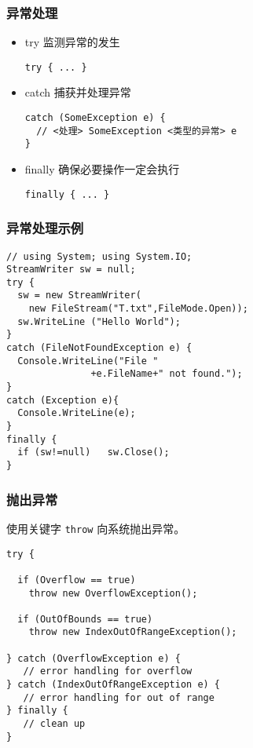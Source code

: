 \begin{frame}[fragile]
\frametitle{异常处理}
\begin{itemize}
\item try 监测异常的发生
\begin{lstlisting}
try { ... }
\end{lstlisting}
  \pause
\item catch 捕获并处理异常
\begin{lstlisting}[escapeinside=<>]
catch (SomeException e) {
  // <处理> SomeException <类型的异常> e
}

\end{lstlisting}
  \pause
\item finally 确保必要操作一定会执行
\begin{lstlisting}
finally { ... }
\end{lstlisting}
\end{itemize}
\end{frame}


\begin{frame}[fragile]
\frametitle{异常处理示例}
\begin{lstlisting}
// using System; using System.IO;
StreamWriter sw = null;
try {
  sw = new StreamWriter(
    new FileStream("T.txt",FileMode.Open));
  sw.WriteLine ("Hello World");
}
catch (FileNotFoundException e) {
  Console.WriteLine("File "
               +e.FileName+" not found.");
}
catch (Exception e){
  Console.WriteLine(e);
}
finally {
  if (sw!=null)   sw.Close();
}

\end{lstlisting}
\end{frame}

\begin{frame}[fragile]
\frametitle{抛出异常}
使用关键字 \texttt{throw} 向系统抛出异常。
\begin{lstlisting}
try {

  if (Overflow == true)
    throw new OverflowException();

  if (OutOfBounds == true)
    throw new IndexOutOfRangeException();

} catch (OverflowException e) {
   // error handling for overflow
} catch (IndexOutOfRangeException e) {
   // error handling for out of range
} finally {
   // clean up
}
\end{lstlisting}
\end{frame}

